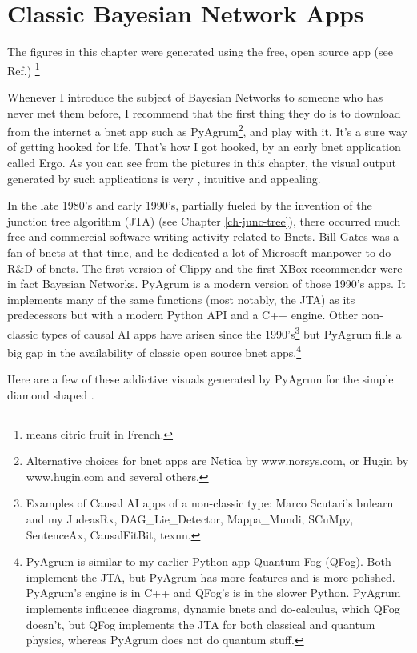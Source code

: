 \chapter{Classic Bayesian Network Apps}
\label{ch-bnet-apps}

The figures in this chapter were generated using
the free, open source app  (see Ref.\cite{pyagrum})
\footnote{ means citric fruit in French. }


Whenever I introduce the subject of Bayesian Networks
to someone who has never met them before, I recommend that the first thing they do is to
download from the internet a  bnet app  such as
PyAgrum\footnote{Alternative choices for bnet apps are Netica by www.norsys.com, or Hugin by www.hugin.com and several others.}, and play with it. It's a sure way of getting hooked
for life. That's how I got hooked, by an early bnet application called Ergo. As you can see from the pictures in this chapter,
the visual output generated by such applications is very ,
 intuitive and appealing.

  
In the late 1980's and early 1990's, partially fueled by the invention of
the junction tree algorithm (JTA) (see Chapter \ref{ch-junc-tree}), there
occurred much free and commercial software writing activity related to Bnets. Bill Gates was a fan of bnets at that time, and he dedicated a lot of Microsoft manpower to do R\&D of bnets. The first version of Clippy and the first XBox recommender were in fact Bayesian Networks. PyAgrum is a modern version of those  1990's apps. It implements many of the same functions (most notably, the JTA) as its predecessors but with a modern Python API and a C++ engine. Other non-classic types of causal AI apps have arisen since the 1990's\footnote{Examples of Causal AI apps of a non-classic type:  Marco Scutari's bnlearn and my JudeasRx, DAG\_Lie\_Detector, Mappa\_Mundi, SCuMpy, SentenceAx, CausalFitBit, texnn.} but PyAgrum fills a big gap in the availability of classic open source bnet apps.\footnote{PyAgrum is similar to my earlier Python app Quantum Fog (QFog). Both implement the JTA, but PyAgrum  has more features and is more polished.
PyAgrum's engine is in C++ and QFog's is in the slower Python.  PyAgrum implements influence diagrams, dynamic bnets
and do-calculus, which QFog doesn't, but QFog implements the JTA for both classical and quantum physics, whereas PyAgrum does not do quantum stuff.}

Here are a few of these addictive visuals generated by PyAgrum
for the simple diamond shaped  .

